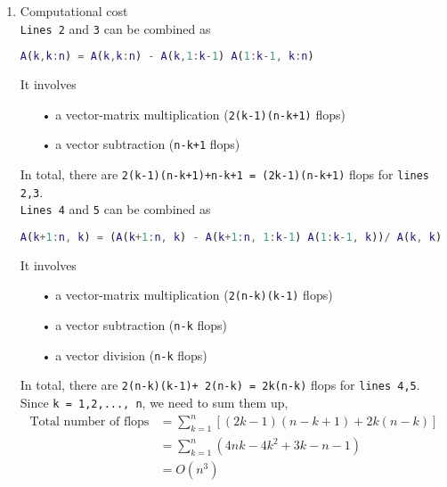 \documentclass[11pt]{article}
\begin{document}
\begin{enumerate}
\item{Computational cost}\\
\texttt{Lines 2} and \texttt{3} can be combined as 
\begin{lstlisting}[language=matlab]
A(k,k:n) = A(k,k:n) - A(k,1:k-1) A(1:k-1, k:n)
\end{lstlisting}
It involves 
\begin{itemize}
\item[•] a vector-matrix multiplication (\texttt{2(k-1)(n-k+1)} flops)
\item[•] a vector subtraction (\texttt{n-k+1} flops)
\end{itemize}
In total, there are \texttt{2(k-1)(n-k+1)+n-k+1 = (2k-1)(n-k+1)} flops for \texttt{lines 2,3}.\\
\texttt{Lines 4} and \texttt{5} can be combined as 
\begin{lstlisting}[language=matlab]
A(k+1:n, k) = (A(k+1:n, k) - A(k+1:n, 1:k-1) A(1:k-1, k))/ A(k, k)
\end{lstlisting}
It involves 
\begin{itemize}
\item[•] a vector-matrix multiplication (\texttt{2(n-k)(k-1)} flops)
\item[•] a vector subtraction (\texttt{n-k} flops)
\item[•] a vector division (\texttt{n-k} flops)
\end{itemize}
In total, there are \texttt{2(n-k)(k-1)+ 2(n-k) = 2k(n-k)} flops for \texttt{lines 4,5}.\\
Since \texttt{k = 1,2,..., n}, we need to sum them up,
\begin{align*}
\text{Total number of flops}&= \sum_{k=1}^{n} [(2k-1)(n-k+1) + 2k(n-k)]\\
&= \sum_{k=1}^{n} (4nk -4k^2 +3k -n -1)\\
&= O(n^{3})
\end{align*}
\end{enumerate}

\newpage
\end{document}
